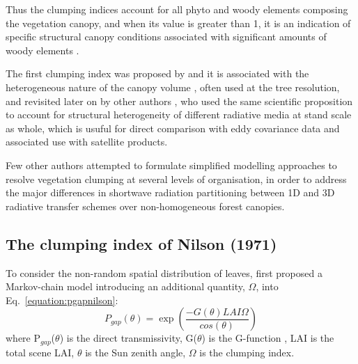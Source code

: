 Thus the clumping indices account for all phyto and woody elements composing the vegetation canopy, and when its value is greater than 1, it is an indication of specific structural canopy conditions associated with significant amounts of woody elements \citep{pinty2006}. 

The first clumping index was proposed by \citet{Nilson1971} and it is associated with the heterogeneous nature of the canopy volume \citep{Norman1974,chen1992,Chen1996}, often used at the tree resolution, and revisited later on by other authors \citep{Pinty2004,pinty2006}, who used the same scientific proposition to account for structural heterogeneity of different radiative media at stand scale as whole, which is usuful for direct comparison with eddy covariance data and associated use with satellite products.

Few other authors \citep{Kucharik1999,pinty2006,Ni-Meister2010} attempted to formulate simplified modelling approaches to resolve vegetation clumping at several levels of organisation, in order to address the major differences in shortwave radiation partitioning between 1D and 3D radiative transfer schemes over non-homogeneous forest canopies.


\subsection{The clumping index of Nilson (1971)}

To consider the non-random spatial distribution of leaves, \citet{Nilson1971} first proposed a Markov-chain model introducing an additional quantity, $\Omega$, into Eq.~\ref{equation:pgapnilson}:
\begin{equation}
P_{gap}(\theta) = \exp{(\frac{-G(\theta)  LAI  \Omega}{cos(\theta)})}
\label{equation:pgapnilson}
\end{equation}
\noindent where P$_{gap}$($\theta$) is the direct transmissivity, G($\theta$) is the G-function \citep{Ross1981}, LAI is the total scene LAI, $\theta$ is the Sun zenith angle, $\Omega$ is the clumping index.


